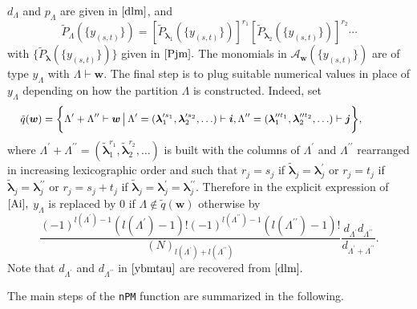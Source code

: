 \(d_{\Lambda}\) and \(p_{\Lambda}\) are given in \(\eqref{dlm}\), and
\[\tilde{P}_{\Lambda}\left( \{y_{(s,t)}\} \right)  = [\tilde{P}_{\boldsymbol{\lambda}_1}
\left( \{y_{(s,t)}\} \right) ]^{r_1} [\tilde{P}_{\boldsymbol{\lambda}_2}\left( \{y_{(s,t)}\} \right) ]^{r_2} 
\cdots\] with
\(\{\tilde{P}_{\boldsymbol{\lambda}}\left( \{y_{(s,t)}\} \right)\}\)
given in \(\eqref{Pjm}.\) The monomials in
\({\mathcal A}_{\boldsymbol{w}}\left( \{y_{(s,t)}\} \right)\) are of
type \(y_{\Lambda}\) with \(\Lambda \vdash \boldsymbol{w}.\) The final
step is to plug suitable numerical values in place of \(y_{\Lambda}\)
depending on how the partition \(\Lambda\) is constructed. Indeed, set
\begin{equation}\label{qw}
\hskip-1.3cm{\small \tilde{q}(\boldsymbol{w}) = \bigg\{  \Lambda^{\prime}+\Lambda^{\prime \prime} \vdash \boldsymbol{w} \, \big| \, \Lambda^{\prime}=(\boldsymbol{\lambda}_1^{\prime s_1}, \boldsymbol{\lambda}_2^{\prime s_2}, \ldots) \vdash \boldsymbol{i}, \Lambda^{\prime \prime} = (\boldsymbol{\lambda}_1^{\prime \prime t_1}, \boldsymbol{\lambda}_2^{\prime \prime t_2},\ldots) \vdash \boldsymbol{j} \bigg\}},\!\!\!
\end{equation} where
\(\Lambda^{\prime}+\Lambda^{\prime \prime}=(\tilde{\boldsymbol{\lambda}}_1^{r_1}, \tilde{\boldsymbol{\lambda}}_2^{r_2}, \ldots)\)
is built with the columns of \(\Lambda^{\prime}\) and
\(\Lambda^{\prime \prime}\) rearranged in increasing lexicographic order
and such that \(r_j=s_j\) if
\(\tilde{\boldsymbol{\lambda}}_j = \boldsymbol{\lambda}^{\prime}_j\) or
\(r_j=t_j\) if
\(\tilde{\boldsymbol{\lambda}}_j = \boldsymbol{\lambda}^{\prime \prime}_j\)
or \(r_j=s_j+t_j\) if
\(\tilde{\boldsymbol{\lambda}}_j = \boldsymbol{\lambda}^{\prime}_j = \boldsymbol{\lambda}^{\prime \prime}_j.\)
Therefore in the explicit expression of \(\eqref{Ai},\) \(y_{\Lambda}\)
is replaced by \(0\) if \(\Lambda \not \in \tilde{q}(\boldsymbol{w})\)
otherwise by \begin{equation}\label{ybmtau}
\frac{{(-1)^{l(\Lambda^{\prime})-1}(l(\Lambda^{\prime})-1)!(-1)^{l(\Lambda^{\prime \prime})-1}(l(\Lambda^{\prime \prime})-1)!}}{(N)_{l(\Lambda^{\prime})+l(\Lambda^{\prime \prime})}} \frac{d_{\Lambda^{\prime}} d_{\Lambda^{\prime \prime}}}{d_{\Lambda^{\prime}+\Lambda^{\prime \prime}}}.
\end{equation} Note that \(d_{\Lambda^{\prime}}\) and
\(d_{\Lambda^{\prime \prime}}\) in \(\eqref{ybmtau}\) are recovered from
\(\eqref{dlm}.\)

\hskip-0.5cm The main steps of the \texttt{nPM} function are summarized
in the following.

